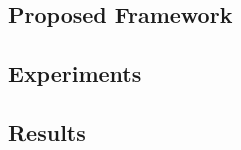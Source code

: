 \subsection{Proposed Framework}

\subsection{Experiments}



\subsection{Results}
\origdevprec
{}\origdevrecall
{}\origdevf
{}\origtestprec
{}\origtestrecall
{}\origtestf
